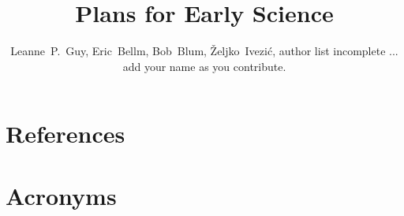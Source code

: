\documentclass[DM,authoryear,toc]{lsstdoc}
\title{Plans for Early Science}
\author{%
Leanne~P.~Guy, Eric~Bellm, Bob~Blum, \v{Z}eljko~Ivezi\'{c}, author list incomplete ... add your name as you contribute.
}
\date{\vcsDate}
\begin{document}
\maketitle

















\appendix
\section{References} \label{sec:bib}
\renewcommand{\refname}{} %


\section{Acronyms} \label{sec:acronyms}

\end{document}
